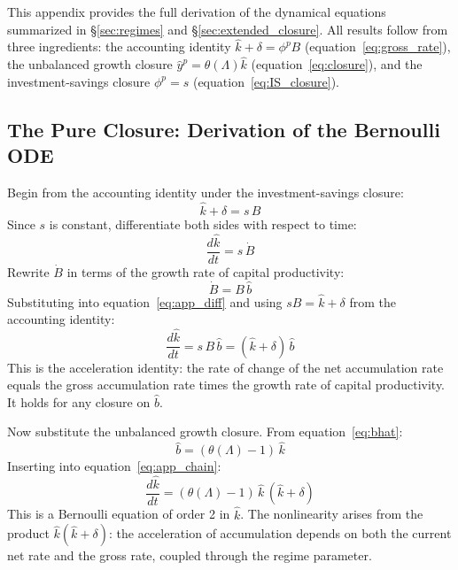 \documentclass[11pt,a4paper]{article}
\begin{document}
This appendix provides the full derivation of the dynamical equations summarized in \S\ref{sec:regimes} and \S\ref{sec:extended_closure}. All results follow from three ingredients: the accounting identity $\hat{k} + \delta = \phi^p B$ (equation~\ref{eq:gross_rate}), the unbalanced growth closure $\hat{y}^p = \theta(\Lambda)\hat{k}$ (equation~\ref{eq:closure}), and the investment-savings closure $\phi^p = s$ (equation~\ref{eq:IS_closure}).


\subsection{The Pure Closure: Derivation of the Bernoulli ODE}
\label{app:bernoulli_derivation}

Begin from the accounting identity under the investment-savings closure:
%
\begin{equation}\label{eq:app_identity}
	\hat{k} + \delta = s \, B
\end{equation}
%
Since $s$ is constant, differentiate both sides with respect to time:
%
\begin{equation}\label{eq:app_diff}
	\frac{d\hat{k}}{dt} = s \, \dot{B}
\end{equation}
%
Rewrite $\dot{B}$ in terms of the growth rate of capital productivity:
%
\begin{equation}\label{eq:app_Bdot}
	\dot{B} = B \, \hat{b}
\end{equation}
%
Substituting into equation~\eqref{eq:app_diff} and using $sB = \hat{k} + \delta$ from the accounting identity:
%
\begin{equation}\label{eq:app_chain}
	\frac{d\hat{k}}{dt} = s \, B \, \hat{b} = (\hat{k} + \delta) \, \hat{b}
\end{equation}
%
This is the acceleration identity: the rate of change of the net accumulation rate equals the gross accumulation rate times the growth rate of capital productivity. It holds for any closure on $\hat{b}$.

Now substitute the unbalanced growth closure. From equation~\eqref{eq:bhat}:
%
\begin{equation}\label{eq:app_bhat}
	\hat{b} = (\theta(\Lambda) - 1) \, \hat{k}
\end{equation}
%
Inserting into equation~\eqref{eq:app_chain}:
%
\begin{equation}\label{eq:app_bernoulli}
	\boxed{\frac{d\hat{k}}{dt} = (\theta(\Lambda) - 1) \, \hat{k} \, (\hat{k} + \delta)}
\end{equation}
%
This is a Bernoulli equation of order 2 in $\hat{k}$. The nonlinearity arises from the product $\hat{k}(\hat{k} + \delta)$: the acceleration of accumulation depends on both the current net rate and the gross rate, coupled through the regime parameter.
\end{document}
